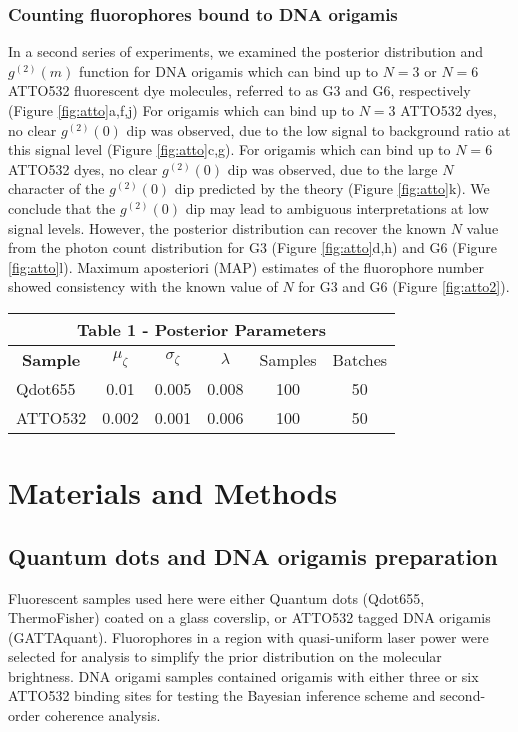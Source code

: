 \subsubsection{Counting fluorophores bound to DNA origamis}


In a second series of experiments, we examined the posterior distribution and $g^{(2)}(m)$ function for DNA origamis which can bind up to $N=3$ or $N=6$ ATTO532 fluorescent dye molecules, referred to as G3 and G6, respectively (Figure \ref{fig:atto}a,f,j) For origamis which can bind up to $N=3$ ATTO532 dyes, no clear $g^{(2)}(0)$ dip was observed, due to the low signal to background ratio at this signal level (Figure \ref{fig:atto}c,g). For origamis which can bind up to $N=6$ ATTO532 dyes, no clear $g^{(2)}(0)$ dip was observed, due to the large $N$ character of the $g^{(2)}(0)$ dip predicted by the theory (Figure \ref{fig:atto}k). We conclude that the $g^{(2)}(0)$ dip may lead to ambiguous interpretations at low signal levels. However, the posterior distribution can recover the known $N$ value from the photon count distribution for G3 (Figure \ref{fig:atto}d,h) and G6 (Figure \ref{fig:atto}l). Maximum aposteriori (MAP) estimates of the fluorophore number showed consistency with the known value of $N$ for G3 and G6 (Figure \ref{fig:atto2}). 

\clearpage
\begin{table}
\centering
\begin{tabular}{lccccc}
\multicolumn{6}{c}{\textbf{Table 1 - Posterior Parameters}} \\ \hline
\multicolumn{1}{c}{\textbf{Sample}}  & $\mu_{\zeta}$ & $\sigma_{\zeta}$ & $\lambda$ & Samples & Batches \\
Qdot655 & 0.01 & 0.005 & 0.008 & 100 & 50 \\
ATTO532 & 0.002 & 0.001 & 0.006 & 100 & 50 \\
\end{tabular}
\end{table}

\section{Materials and Methods}

\subsection{Quantum dots and DNA origamis preparation}

Fluorescent samples used here were either Quantum dots (Qdot655, ThermoFisher) coated on a glass coverslip, or ATTO532 tagged DNA origamis (GATTAquant). Fluorophores in a region with quasi-uniform laser power were selected for analysis to simplify the prior distribution on the molecular brightness. DNA origami samples contained origamis with either three or six ATTO532 binding sites for testing the Bayesian inference scheme and second-order coherence analysis. 

